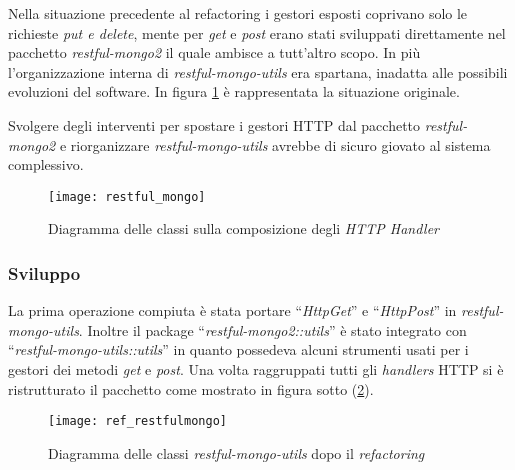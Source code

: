 Nella situazione precedente al \gls{refactoring} i gestori esposti coprivano
solo le richieste \textit{put e delete}, mente per \textit{get} e \textit{post}
erano stati sviluppati direttamente nel pacchetto \textit{restful-mongo2} il
quale ambisce a tutt'altro scopo. In più l'organizzazione interna di
\textit{restful-mongo-utils} era spartana, inadatta alle possibili evoluzioni
del software. In figura \ref{fig:restful_mongo} è rappresentata la situazione
originale.

Svolgere degli interventi per spostare i gestori HTTP dal pacchetto
\textit{restful-mongo2} e riorganizzare \textit{restful-mongo-utils} avrebbe
di sicuro giovato al sistema complessivo.

\begin{figure}[H]
\begin{center}
\texttt{[image: restful\_mongo]}
\caption{
Diagramma delle classi sulla composizione degli \textit{HTTP Handler}
}
\label{fig:restful_mongo}
\end{center}
\end{figure}

\subsubsection{Sviluppo}
La prima operazione compiuta è stata portare ``\textit{HttpGet}'' e
``\textit{HttpPost}'' in \textit{restful-mongo-utils}. Inoltre il package
``\textit{restful-mongo2::utils}'' è stato integrato con
``\textit{restful-mongo-utils::utils}'' in quanto possedeva alcuni strumenti
usati per i gestori dei metodi \textit{get} e \textit{post}. Una volta
raggruppati tutti gli \textit{handlers} HTTP si è ristrutturato il pacchetto
come mostrato in figura sotto (\ref{fig:ref_restfulmongo}).

\begin{figure}[H]
\begin{center}
\texttt{[image: ref\_restfulmongo]}
\caption{
Diagramma delle classi \textit{restful-mongo-utils} dopo il \textit{refactoring}
}
\label{fig:ref_restfulmongo}
\end{center}
\end{figure}

